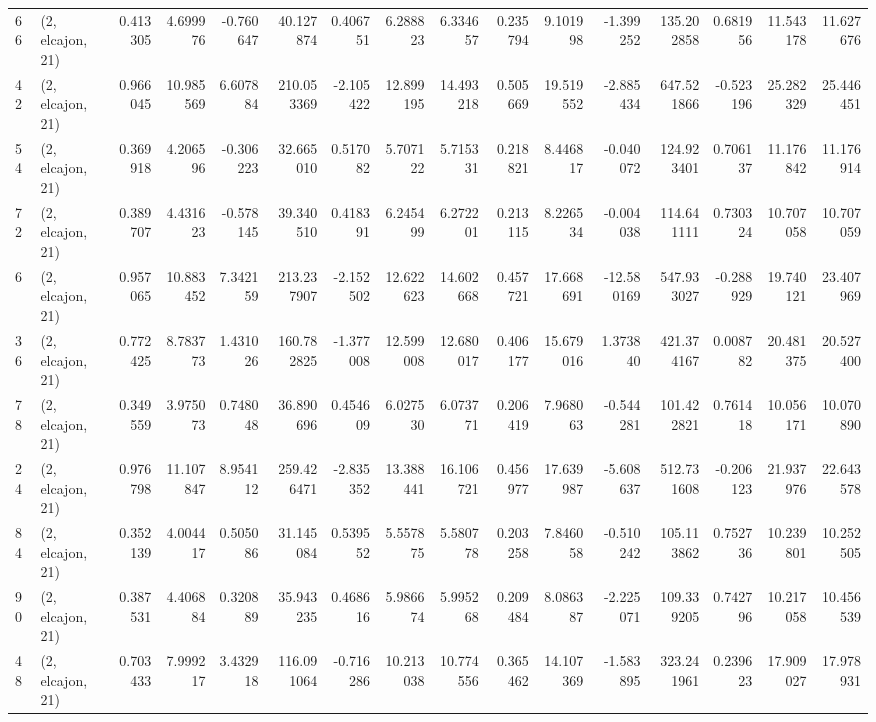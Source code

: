 \begin{tabular}{llrrrrrrrrrrrrrr}
66  &  (2, elcajon, 21) &   0.413305 &   4.699976 &  -0.760647 &    40.127874 &   0.406751 &   6.288823 &   6.334657 &  0.235794 &   9.101998 &  -1.399252 &    135.202858 &    0.681956 &   11.543178 &   11.627676 \\
42  &  (2, elcajon, 21) &   0.966045 &  10.985569 &   6.607884 &   210.053369 &  -2.105422 &  12.899195 &  14.493218 &  0.505669 &  19.519552 &  -2.885434 &    647.521866 &   -0.523196 &   25.282329 &   25.446451 \\
54  &  (2, elcajon, 21) &   0.369918 &   4.206596 &  -0.306223 &    32.665010 &   0.517082 &   5.707122 &   5.715331 &  0.218821 &   8.446817 &  -0.040072 &    124.923401 &    0.706137 &   11.176842 &   11.176914 \\
72  &  (2, elcajon, 21) &   0.389707 &   4.431623 &  -0.578145 &    39.340510 &   0.418391 &   6.245499 &   6.272201 &  0.213115 &   8.226534 &  -0.004038 &    114.641111 &    0.730324 &   10.707058 &   10.707059 \\
6   &  (2, elcajon, 21) &   0.957065 &  10.883452 &   7.342159 &   213.237907 &  -2.152502 &  12.622623 &  14.602668 &  0.457721 &  17.668691 & -12.580169 &    547.933027 &   -0.288929 &   19.740121 &   23.407969 \\
36  &  (2, elcajon, 21) &   0.772425 &   8.783773 &   1.431026 &   160.782825 &  -1.377008 &  12.599008 &  12.680017 &  0.406177 &  15.679016 &   1.373840 &    421.374167 &    0.008782 &   20.481375 &   20.527400 \\
78  &  (2, elcajon, 21) &   0.349559 &   3.975073 &   0.748048 &    36.890696 &   0.454609 &   6.027530 &   6.073771 &  0.206419 &   7.968063 &  -0.544281 &    101.422821 &    0.761418 &   10.056171 &   10.070890 \\
24  &  (2, elcajon, 21) &   0.976798 &  11.107847 &   8.954112 &   259.426471 &  -2.835352 &  13.388441 &  16.106721 &  0.456977 &  17.639987 &  -5.608637 &    512.731608 &   -0.206123 &   21.937976 &   22.643578 \\
84  &  (2, elcajon, 21) &   0.352139 &   4.004417 &   0.505086 &    31.145084 &   0.539552 &   5.557875 &   5.580778 &  0.203258 &   7.846058 &  -0.510242 &    105.113862 &    0.752736 &   10.239801 &   10.252505 \\
90  &  (2, elcajon, 21) &   0.387531 &   4.406884 &   0.320889 &    35.943235 &   0.468616 &   5.986674 &   5.995268 &  0.209484 &   8.086387 &  -2.225071 &    109.339205 &    0.742796 &   10.217058 &   10.456539 \\
48  &  (2, elcajon, 21) &   0.703433 &   7.999217 &   3.432918 &   116.091064 &  -0.716286 &  10.213038 &  10.774556 &  0.365462 &  14.107369 &  -1.583895 &    323.241961 &    0.239623 &   17.909027 &   17.978931 \\

\end{tabular}
